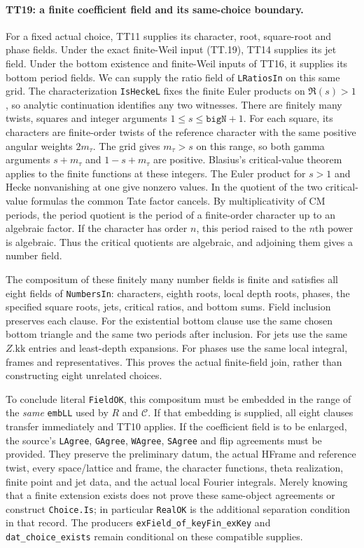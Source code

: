 \paragraph{TT19: a finite coefficient field and its same-choice boundary.}
For a fixed actual choice, TT11 supplies its character, root,
square-root and phase fields. Under the exact finite-Weil input
(TT.19), TT14 supplies its jet field. Under the bottom existence
and finite-Weil inputs of TT16, it supplies its bottom period
fields. We can supply the ratio field of \texttt{LRatiosIn} on
this same grid. The characterization \texttt{IsHeckeL} fixes
the finite Euler products on $\Re(s)>1$, so analytic continuation
identifies any two witnesses. There are finitely many twists,
squares and integer arguments $1\le s\le\texttt{bigN}+1$.
For each square, its characters are finite-order twists of the
reference character with the same positive angular weights $2m_\tau$.
The grid gives $m_\tau>s$ on this range, so both gamma arguments
$s+m_\tau$ and $1-s+m_\tau$ are positive. Blasius's critical-value
theorem applies to the finite functions at these integers.
The Euler product for $s>1$ and Hecke nonvanishing at one give
nonzero values. In the quotient of the two critical-value formulas
the common Tate factor cancels. By multiplicativity of CM periods,
the period quotient is the period of a finite-order character up to
an algebraic factor. If the character has order $n$, this period
raised to the $n$th power is algebraic. Thus the critical quotients
are algebraic, and adjoining them gives a number field.

The compositum of these finitely many number fields is finite and
satisfies all eight fields of \texttt{NumbersIn}: characters,
eighth roots, local depth roots, phases, the specified square
roots, jets, critical ratios, and bottom sums. Field inclusion
preserves each clause. For the existential bottom clause use the
same chosen bottom triangle and the same two periods after
inclusion. For jets use the same $Z.\mathrm{kk}$ entries and
least-depth expansions. For phases use the same local integral,
frames and representatives. This proves the actual finite-field
join, rather than constructing eight unrelated choices.

To conclude literal \texttt{FieldOK}, this compositum must be
embedded in the range of the \emph{same} \texttt{embLL} used by
$R$ and $\mathcal C$. If that embedding is supplied, all eight
clauses transfer immediately and TT10 applies. If the coefficient
field is to be enlarged, the source's \texttt{LAgree},
\texttt{GAgree}, \texttt{WAgree}, \texttt{SAgree} and flip
agreements must be provided. They preserve the preliminary datum,
the actual HFrame and reference twist, every space/lattice and
frame, the character functions, theta realization, finite point
and jet data, and the actual local Fourier integrals. Merely
knowing that a finite extension exists does not prove these
same-object agreements or construct \texttt{Choice.Is}; in
particular \texttt{RealOK} is the additional separation condition
in that record. The producers \texttt{exField\_of\_keyFin\_exKey}
and \texttt{dat\_choice\_exists} remain conditional on these
compatible supplies.

